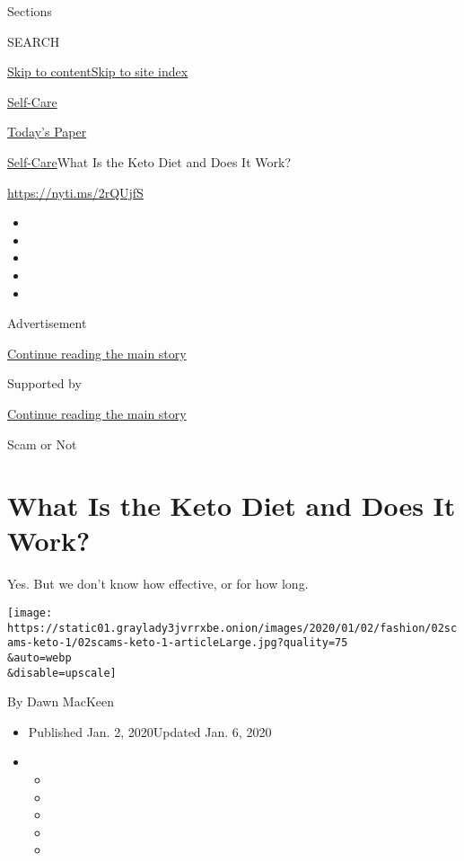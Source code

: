 Sections

SEARCH

\protect\hyperlink{site-content}{Skip to
content}\protect\hyperlink{site-index}{Skip to site index}

\href{https://www.nytimes3xbfgragh.onion/section/style/self-care/}{Self-Care}

\href{https://myaccount.nytimes3xbfgragh.onion/auth/login?response_type=cookie\&client_id=vi}{}

\href{https://www.nytimes3xbfgragh.onion/section/todayspaper}{Today's
Paper}

\href{/section/style/self-care/}{Self-Care}\textbar{}What Is the Keto
Diet and Does It Work?

\url{https://nyti.ms/2rQUjfS}

\begin{itemize}
\item
\item
\item
\item
\item
\end{itemize}

Advertisement

\protect\hyperlink{after-top}{Continue reading the main story}

Supported by

\protect\hyperlink{after-sponsor}{Continue reading the main story}

Scam or Not

\hypertarget{what-is-the-keto-diet-and-does-it-work}{%
\section{What Is the Keto Diet and Does It
Work?}\label{what-is-the-keto-diet-and-does-it-work}}

Yes. But we don't know how effective, or for how long.

\texttt{[image: https://static01.graylady3jvrrxbe.onion/images/2020/01/02/fashion/02scams-keto-1/02scams-keto-1-articleLarge.jpg?quality=75\\\&auto=webp\\\&disable=upscale]}

By Dawn MacKeen

\begin{itemize}
\item
  Published Jan. 2, 2020Updated Jan. 6, 2020
\item
  \begin{itemize}
  \item
  \item
  \item
  \item
  \item
  \end{itemize}
\end{itemize}

